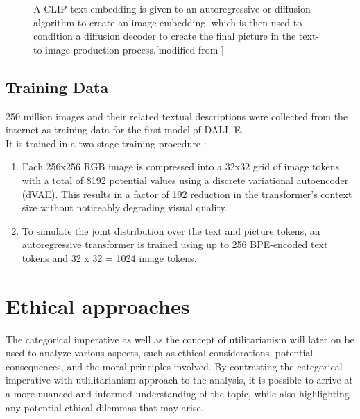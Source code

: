\documentclass[9pt,twocolumn,twoside]{osajnl}
\begin{document}
\begin{figure} [h]
	\centering
	\caption{A CLIP text embedding is given to an autoregressive or diffusion algorithm to create an image embedding, which is then used to condition a diffusion decoder to create the final picture in the text-to-image production process.[modified from \cite{CLIP}]}
\end{figure}

\subsection{Training Data}
250 million images and their related textual descriptions were collected from the internet as training data for the first model of DALL-E.\\
It is trained in a two-stage training procedure \cite{zeroShot}:
\begin{enumerate}
	\item Each 256x256 RGB image is compressed into a 32x32 grid of image tokens with a total of 8192 potential values using a discrete variational autoencoder (dVAE). This results in a factor of 192 reduction in the transformer's context size without noticeably degrading visual quality.
	\item To simulate the joint distribution over the text and picture tokens, an autoregressive transformer is trained using up to 256 BPE-encoded text tokens and 32 x 32 = 1024 image tokens.
\end{enumerate}


\section{Ethical approaches}
The categorical imperative as well as the concept of utilitarianism will later on be used to analyze various aspects, such as ethical considerations, potential consequences, and the moral principles involved. 
By contrasting the categorical imperative with utlilitarianism approach to the analysis, it is possible to arrive at a more nuanced and informed understanding of the topic, while also highlighting any potential ethical dilemmas that may arise.
\end{document}
